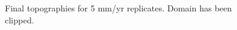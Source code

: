 \begin{figure}[!ht]
	\caption{Final topographies for 5 mm/yr replicates. Domain has been clipped.}
	\label{fig:005topo}
\end{figure}

